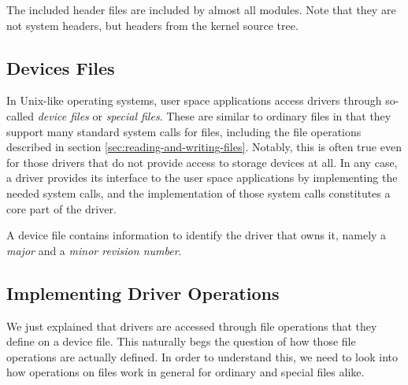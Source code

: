 The included header files are included by almost all modules. Note that they are not system headers, but headers from the kernel source tree.


\subsection{Devices Files}
In Unix-like operating systems, user space applications access drivers through so-called \emph{device files} or \emph{special files}. These are similar to ordinary files in that they support many standard system calls for files, including the file operations described in section \ref{sec:reading-and-writing-files}. Notably, this is often true even for those drivers that do not provide access to storage devices at all. In any case, a driver provides its interface to the user space applications by implementing the needed system calls, and the implementation of those system calls constitutes a core part of the driver.

A device file contains information to identify the driver that owns it, namely a \emph{major} and a \emph{minor revision number}.



\subsection{Implementing Driver Operations}
We just explained that drivers are accessed through file operations that they define on a device file. This naturally begs the question of how those file operations are actually defined. In order to understand this, we need to look into how operations on files work in general for ordinary and special files alike.

